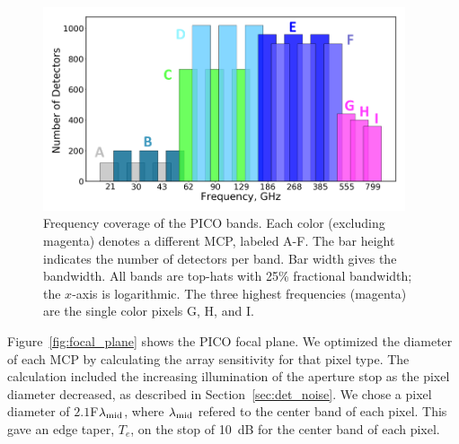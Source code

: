 \documentclass[]{spie}  %
\begin{document}
\begin{figure} [ht]
\begin{center}
\includegraphics[height=6cm]{bands_label.png}
\end{center}
\caption { \label{fig:bands} 
Frequency coverage of the PICO bands. Each color (excluding magenta) denotes a different MCP, labeled A-F. The bar height 
indicates the number of detectors per band.  Bar width gives the bandwidth. All bands are top-hats with 
25\% fractional bandwidth; the $x$-axis is logarithmic.  The three highest frequencies (magenta) are the 
single color pixels G, H, and I.}
\end{figure} 


Figure~\ref{fig:focal_plane} shows the PICO focal plane.  
We optimized the diameter of each MCP by calculating the array sensitivity for that pixel type. The calculation included the 
increasing illumination of the aperture stop as the pixel diameter decreased, as described in Section~\ref{sec:det_noise}.
We chose a pixel diameter of $2.1$F$\lambda_{\rm mid}$, where $\lambda_{\rm mid}$ refered to the center 
band of each pixel. This gave an edge taper, $T_e$, on the stop of 10~dB for the center band of each pixel. 
\end{document}
